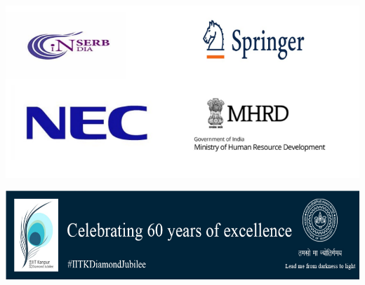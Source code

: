 



\vfill

\begin{center}
\includegraphics[width=\textwidth]{images/logos/sponsors2.png}

\vfill

\includegraphics[width=\textwidth]{images/logos/diamondJubilee.png}
\end{center}